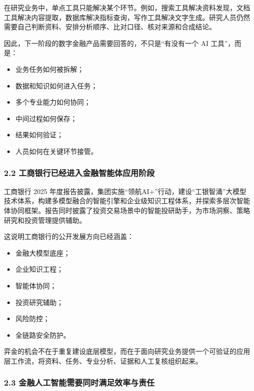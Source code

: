 \documentclass[a4paper,12pt,fontset=none]{ctexart}
\begin{document}
在研究业务中，单点工具只能解决某个环节。例如，搜索工具解决资料发现，文档工具解决内容提取，数据库解决指标查询，写作工具解决文字生成。研究人员仍然需要自己判断资料、安排分析顺序、比对口径、核对来源和合成结论。

因此，下一阶段的数字金融产品需要回答的，不只是``有没有一个 AI
工具''，而是：

\begin{itemize}
\tightlist
\item
  业务任务如何被拆解；
\item
  数据和知识如何进入任务；
\item
  多个专业能力如何协同；
\item
  中间过程如何保存；
\item
  结果如何验证；
\item
  人员如何在关键环节接管。
\end{itemize}

\subsubsection{2.2
工商银行已经进入金融智能体应用阶段}\label{ux5de5ux5546ux94f6ux884cux5df2ux7ecfux8fdbux5165ux91d1ux878dux667aux80fdux4f53ux5e94ux7528ux9636ux6bb5}

工商银行 2025
年度报告披露，集团实施``领航AI+''行动，建设``工银智涌''大模型技术体系，构建多模型融合的智能引擎和企业级知识工程体系，并探索多层次智能体协同框架。报告同时披露了投资交易场景中的智能投研助手，为市场洞察、策略研究和投资管理提供辅助。

这说明工商银行的公开发展方向已经涵盖：

\begin{itemize}
\tightlist
\item
  金融大模型底座；
\item
  企业知识工程；
\item
  智能体协同；
\item
  投资研究辅助；
\item
  风险防控；
\item
  全链路安全防护。
\end{itemize}

弈金的机会不在于重复建设底层模型，而在于面向研究业务提供一个可验证的应用层工作流，将资料、任务、专业分析、证据和人工复核组织起来。

\subsubsection{2.3
金融人工智能需要同时满足效率与责任}\label{ux91d1ux878dux4ebaux5de5ux667aux80fdux9700ux8981ux540cux65f6ux6ee1ux8db3ux6548ux7387ux4e0eux8d23ux4efb}
\end{document}

